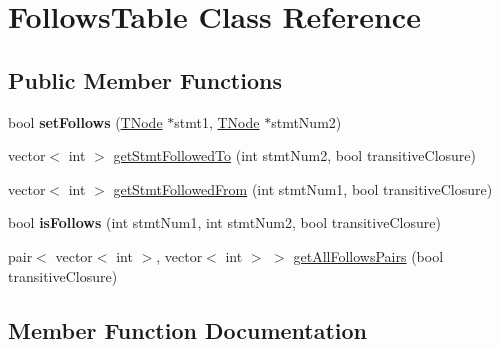 \hypertarget{class_follows_table}{}\section{Follows\+Table Class Reference}
\label{class_follows_table}
\subsection*{Public Member Functions}
\begin{DoxyCompactItemize}
\item 
\hypertarget{class_follows_table_a9a35439952bc7b7c6b74bf2bf1cc5ae6}{}bool {\bfseries set\+Follows} (\hyperlink{class_t_node}{T\+Node} $\ast$stmt1, \hyperlink{class_t_node}{T\+Node} $\ast$stmt\+Num2)\label{class_follows_table_a9a35439952bc7b7c6b74bf2bf1cc5ae6}

\item 
vector$<$ int $>$ \hyperlink{class_follows_table_aad4ac1a173cf874fc63b54f517b2c217}{get\+Stmt\+Followed\+To} (int stmt\+Num2, bool transitive\+Closure)
\item 
vector$<$ int $>$ \hyperlink{class_follows_table_a7e1b0324d400cf2736bc8b36df148e4c}{get\+Stmt\+Followed\+From} (int stmt\+Num1, bool transitive\+Closure)
\item 
\hypertarget{class_follows_table_a2d23303a2ad8597ef203653b8708f0ee}{}bool {\bfseries is\+Follows} (int stmt\+Num1, int stmt\+Num2, bool transitive\+Closure)\label{class_follows_table_a2d23303a2ad8597ef203653b8708f0ee}

\item 
pair$<$ vector$<$ int $>$, vector$<$ int $>$ $>$ \hyperlink{class_follows_table_a763e4e7eb22a7420a0107f3380527516}{get\+All\+Follows\+Pairs} (bool transitive\+Closure)
\end{DoxyCompactItemize}


\subsection{Member Function Documentation}
\hypertarget{class_follows_table_a763e4e7eb22a7420a0107f3380527516}{}
